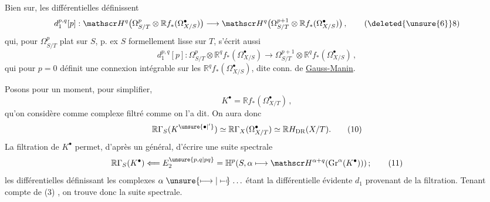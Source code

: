  Bien sur, les différentielles  définissent
\[
 d_1^{p,q}[p]:\mathscr H^q\bigl(\Omega^p_{S/T}\otimes\mathbb R f_*(\Omega^\bullet_{X/S})\bigr)\longrightarrow
 \mathscr H^q\bigl(\Omega^{p+1}_{S/T}\otimes\mathbb R f_*(\Omega^\bullet_{X/S})\bigr) \,, \tag*{(\deleted{\unsure{6}}8)}
\]
qui, pour $\Omega^p_{S/T}$ plat sur $S$, p. ex $S$ formellement lisse sur $T$,  s'écrit aussi
\[
 d_1^{p,q}[p]:\Omega^p_{S/T}\otimes\mathbb R^q f_*(\Omega^\bullet_{X/S})\longrightarrow
 \Omega^{p+1}_{S/T}\otimes\mathbb R^q f_*(\Omega^\bullet_{X/S}) \,, \tag*{(8$'$)}
\]
qui pour $p=0$ définit une connexion intégrable sur les $\mathbb R^q f_*(\Omega^\bullet_{X/S})$, dite conn. de \uline{Gauss-Manin}.

Posons pour un moment, pour simplifier,
\[
 K^\bullet=\mathbb R f_*(\Omega^\bullet_{X/T}) \,, \tag*{(9)}
\]
qu'on considère comme complexe filtré comme on l'a dit. On aura donc
\[
 \mathbb R\Gamma_S(K^{\unsure{\bullet|'}})\simeq\mathbb R\Gamma_X(\Omega^\bullet_{X/T})\simeq\mathbb RH_{\mathrm{DR}}(X/T). \tag*{(10)}
\]
La filtration de $K^\bullet$ permet, d'après un  général, d'écrire une suite spectrale
\[
 \mathbb R\Gamma_S(K^\bullet)\Longleftarrow E^{\unsure{p,q|pq}}_2=\mathbb H^p(S,\alpha\longmapsto\mathscr H^{\alpha+q}(\mathrm{Gr}^\alpha(K^\bullet))) \,; \tag*{(11)}
\]
les différentielles définissant les complexes $\alpha\mathrel{\unsure{\longmapsto|\mapstochar\relbar\mapstochar}}\ldots$ étant la différentielle évidente $d_1$ provenant de la filtration. Tenant compte de (3) , on trouve donc la suite spectrale.
